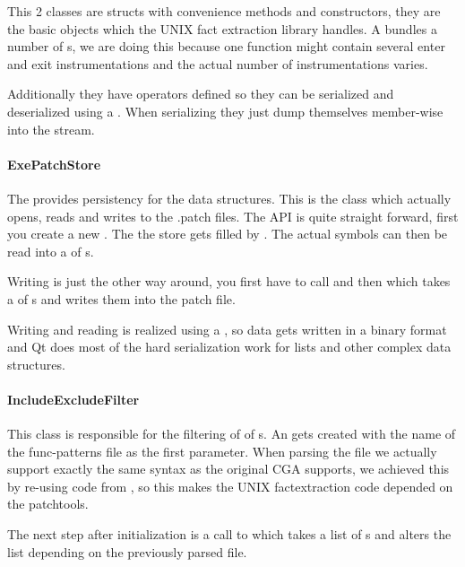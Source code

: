 This 2 classes are structs with convenience methods and constructors, they are the basic objects which the UNIX fact extraction library handles.  A  bundles a number of s, we are doing this because one function might contain several enter and exit instrumentations and the actual number of instrumentations varies.

Additionally they have operators defined so they can be serialized and deserialized using a .  When serializing they just dump themselves member-wise into the stream.

\paragraph{ExePatchStore}

The  provides persistency for the data structures.  This is the class which actually opens, reads and writes to the .patch files.  The API is quite straight forward, first you create a new .  The the store gets filled by .  The actual symbols can then be read into a  of s.

Writing is just the other way around, you first have to call  and then  which takes a  of s and writes them into the patch file.

Writing and reading is realized using a , so data gets written in a binary format and Qt does most of the hard serialization work for lists and other complex data structures.

\paragraph{IncludeExcludeFilter}

This class is responsible for the filtering of  of s.   An  gets created with the name of the func-patterns file as the first parameter.  When parsing the file we actually support exactly the same syntax as the original CGA supports, we achieved this by re-using code from , so this makes the UNIX factextraction code depended on the patchtools.

The next step after initialization is a call to  which takes a list of s and alters the list depending on the previously parsed file.

